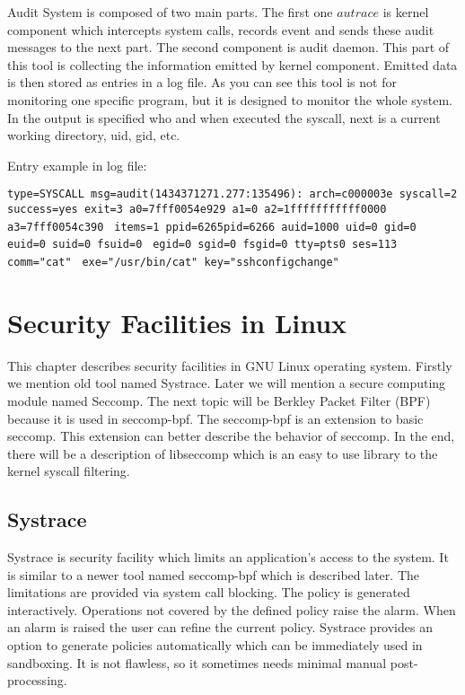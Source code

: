 Audit System is composed of two main parts.
The first one \(autrace\) is kernel component which intercepts system calls, records event and sends these audit messages to the next part.
The second component is audit daemon.
This part of this tool is collecting the information emitted by kernel component.
Emitted data is then stored as entries in a log file.
As you can see this tool is not for monitoring one specific program, but it is designed to monitor the whole system.
In the output is specified who and when executed the syscall, next is a current working directory, uid, gid, etc.

Entry example in log file:

\noindent
\texttt{type=SYSCALL msg=audit(1434371271.277:135496): arch=c000003e syscall=2}\linebreak
\texttt{success=yes exit=3 a0=7fff0054e929 a1=0 a2=1fffffffffff0000 a3=7fff0054c390 }\linebreak
\texttt{items=1 ppid=6265pid=6266 auid=1000 uid=0 gid=0 euid=0 suid=0 fsuid=0 }\linebreak
\texttt{egid=0 sgid=0 fsgid=0 tty=pts0 ses=113 comm="cat" }\linebreak
\texttt{exe="/usr/bin/cat" key="sshconfigchange"}



\chapter{Security Facilities in Linux}
This chapter describes security facilities in GNU Linux operating system.
Firstly we mention old tool named Systrace\cite{systrace_web}.
Later we will mention a secure computing module named Seccomp\cite{seccomp_sandbox}.
The next topic will be Berkley Packet Filter (BPF) because it is used in seccomp-bpf.
The seccomp-bpf is an extension to basic seccomp.
This extension can better describe the behavior of seccomp.
In the end, there will be a description of libseccomp which is an easy to use library to the kernel syscall filtering.

\section{Systrace}
Systrace is security facility which limits an application's access to the system.
It is similar to a newer tool named seccomp-bpf which is described later.
The limitations are provided via system call blocking.
The policy is generated interactively.
Operations not covered by the defined policy raise the alarm.
When an alarm is raised the user can refine the current policy.
Systrace provides an option to generate policies automatically which can be immediately used in sandboxing.
It is not flawless, so it sometimes needs minimal manual post-processing.

